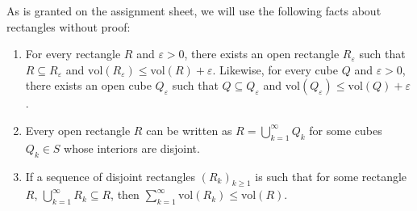 \noindent As is granted on the assignment sheet, we will use the following facts about rectangles without proof:
\begin{enumerate}
	\item For every rectangle \( R \) and \( \varepsilon > 0 \), there exists an open rectangle \( R_\varepsilon  \) such that \( R \subseteq R_\varepsilon  \) and \( \mbox{vol}(R_\varepsilon ) \leq \mbox{vol}(R) + \varepsilon  \). Likewise, for every cube \( Q \) and \( \varepsilon > 0 \), there exists an open cube \( Q_\varepsilon  \) such that \( Q \subseteq Q_\varepsilon  \) and \( \mbox{vol}(Q_\varepsilon ) \leq \mbox{vol}(Q) + \varepsilon  \).
	\item Every open rectangle \( R \) can be written as \( R = \bigcup_{k=1}^{\infty} Q_k \) for some cubes \( Q_k \in S \) whose interiors are disjoint.
	\item If a sequence of disjoint rectangles \( (R_k)_{k \geq 1}  \) is such that for some rectangle \( R \), \( \bigcup_{k=1}^{\infty} R_k \subseteq R \), then \( \sum_{k=1}^{\infty} \mbox{vol}(R_k) \leq \mbox{vol}(R) \).	
	
	
\end{enumerate}
